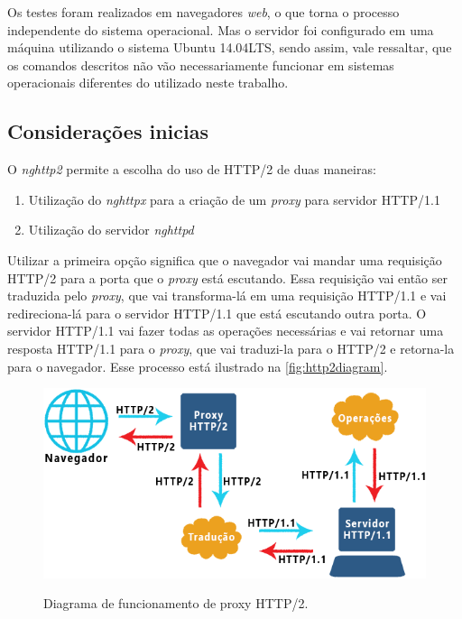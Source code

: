 Os testes foram realizados em navegadores \textit{web}, o que torna o processo independente do sistema operacional. Mas o servidor foi configurado em uma máquina utilizando o sistema Ubuntu 14.04LTS, sendo assim, vale ressaltar, que os comandos descritos não vão necessariamente funcionar em sistemas operacionais diferentes do utilizado neste trabalho.

\subsection{Considerações inicias}
\label{consideracoesiniciais}

O \textit{nghttp2} permite a escolha do uso de HTTP/2 de duas maneiras:
\begin{enumerate}
	\item Utilização do \textit{nghttpx} para a criação de um \textit{proxy} para servidor HTTP/1.1
	\item Utilização do servidor \textit{nghttpd}
\end{enumerate}

Utilizar a primeira opção significa que o navegador vai mandar uma requisição HTTP/2 para a porta que o \textit{proxy} está escutando. Essa requisição vai então ser traduzida pelo \textit{proxy}, que vai transforma-lá em uma requisição HTTP/1.1 e vai redireciona-lá para o servidor HTTP/1.1 que está escutando outra porta. O servidor HTTP/1.1 vai fazer todas as operações necessárias e vai retornar uma resposta HTTP/1.1 para o \textit{proxy}, que vai traduzi-la para o HTTP/2 e retorna-la para o navegador. Esse processo está ilustrado na \autoref{fig:http2diagram}.

\begin{figure}[!htb]
    \centering
    \caption{Diagrama de funcionamento de proxy HTTP/2.}
    \includegraphics[width=1.0\textwidth]{./04-figuras/desenvolvimento/http2_proxy_diagram}
    \label{fig:http2diagram}
\end{figure}

